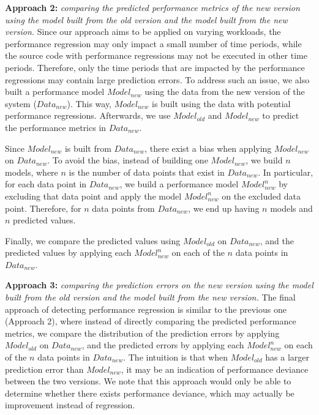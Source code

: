 \noindent\textbf{Approach 2: }\emph{comparing the predicted performance metrics of the new version using the model built from the old version and the model built from the new version.} %
Since our approach aims to be applied on varying workloads, the performance regression may only impact a small number of time periods, while the source code with performance regressions may not be executed in other time periods. Therefore, only the time periods that are impacted by the performance regressions may contain large prediction errors. To address such an issue, we also built a performance model $Model_{new}$ using the data from the new version of the system ($Data_{new}$). 
This way, $Model_{new}$ is built using the data with potential performance regressions. 
Afterwards, we use $Model_{old}$ and $Model_{new}$ to predict the performance metrics in $Data_{new}$. 

Since $Model_{new}$ is built from $Data_{new}$, there exist a bias when applying $Model_{new}$ on $Data_{new}$. To avoid the bias, instead of building one $Model_{new}$, we build $n$ models, where $n$ is the number of data points that exist in $Data_{new}$. In particular, for each data point in $Data_{new}$, we build a performance model $Model_{new}^n$ by excluding that data point and apply the model $Model_{new}^n$ on the excluded data point. Therefore, for $n$ data points from $Data_{new}$, we end up having $n$ models and $n$ predicted values. 

Finally, we compare the predicted values using $Model_{old}$ on $Data_{new}$, and the predicted values by applying each $Model_{new}^n$ on each of the $n$ data points in $Data_{new}$.


\noindent\textbf{Approach 3: }\emph{comparing the prediction errors on the new version using the model built from the old version and the model built from the new version.}
The final approach of detecting performance regression is similar to the previous one (Approach 2), where instead of directly comparing the predicted performance metrics, we compare the distribution of the prediction errors by applying $Model_{old}$ on $Data_{new}$, and the predicted errors by applying each $Model_{new}^n$ on each of the $n$ data points in $Data_{new}$. The intuition is that when $Model_{old}$ has a larger prediction error than $Model_{new}$, it may be an indication of performance deviance between the two versions. We note that this approach would only be able to determine whether there exists performance deviance, which may actually be improvement instead of regression. 


